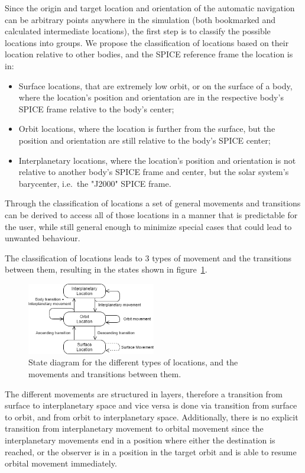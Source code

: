 Since the origin and target location and orientation of the automatic navigation can be arbitrary points anywhere in
the simulation (both bookmarked and calculated intermediate locations), the first step is to classify the possible
locations into groups.
We propose the classification of locations based on their location relative to other bodies, and the SPICE reference
frame the location is in:
\begin{itemize}
    \item Surface locations, that are extremely low orbit, or on the surface of a body, where the location's position
    and orientation are in the respective body's SPICE frame relative to the body's center;
    \item Orbit locations, where the location is further from the surface, but the position and orientation
    are still relative to the body's SPICE center;
    \item Interplanetary locations, where the location's position and orientation is not relative to another body's
    SPICE frame and center, but the solar system's barycenter, i.e.\ the "J2000" SPICE frame.
\end{itemize}
Through the classification of locations a set of general movements and transitions can be derived to access all of
those locations in a manner that is predictable for the user, while still general enough to minimize special cases
that could lead to unwanted behaviour.

The classification of locations leads to 3 types of movement and the transitions between them, resulting in the states
shown in figure~\ref{fig:nav-states}.

\begin{figure}[h]
    \centering
    \includegraphics[width=0.5\textwidth]{content/4_3_autoNavigation/img/NavigationLocationStates}
    \caption{State diagram for the different types of locations, and the movements and transitions between them.}
    \label{fig:nav-states}
\end{figure}

The different movements are structured in layers, therefore a transition from surface to interplanetary space and
vice versa is done via transition from surface to orbit, and from orbit to interplanetary space.
Additionally, there is no explicit transition from interplanetary movement to orbital movement since the interplanetary
movements end in a position where either the destination is reached, or the observer is in a position in the target
orbit and is able to resume orbital movement immediately.

